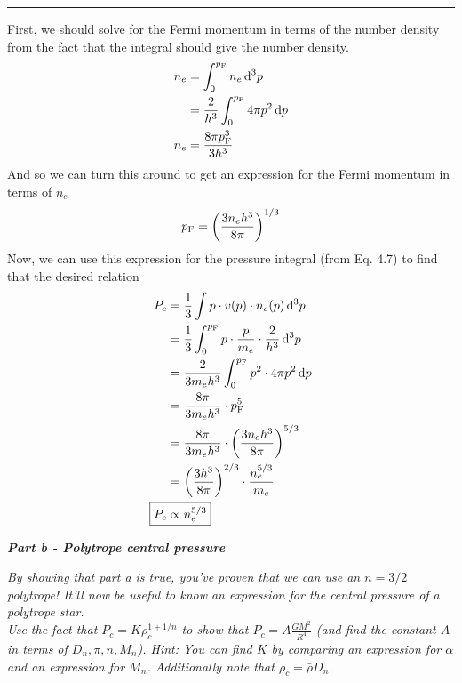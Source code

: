 \documentclass[12pt, letterpaper, twoside]{article}
\newcommand{\question}[1]{{\noindent \it #1}}
\newcommand{\answer}[1]{
    \par\noindent\rule{\textwidth}{0.4pt}#1\vspace{0.5cm}
}
\begin{document}
\answer{
    First, we should solve for the Fermi momentum in terms of the number density from the fact that the integral should give the number density.
    \begin{align}
        n_e &= \int_0^{p_{\rm F}} n_e \dd[3]{p} \\
            &= \frac{2}{h^3} \int_0^{p_{\rm F}} 4 \pi p^2 \dd{p} \\
        n_e &= \frac{8 \pi p_{\rm F}^3}{3 h^3}
    \end{align}
    And so we can turn this around to get an expression for the Fermi momentum in terms of $n_e$
    \begin{equation}
        p_{\rm F} = \qty(\frac{3 n_e h^3}{8 \pi})^{1/3}
    \end{equation}
    Now, we can use this expression for the pressure integral (from Eq. 4.7) to find that the desired relation
    \begin{align}
        P_e &= \frac{1}{3} \int p \cdot v(p) \cdot n_e(p) \dd[3]{p} \\
            &= \frac{1}{3} \int_0^{p_{\rm F}} p \cdot \frac{p}{m_e} \cdot \frac{2}{h^3} \dd[3]{p} \\
            &= \frac{2}{3 m_e h^3} \int_0^{p_{\rm F}} p^2 \cdot 4 \pi p^2 \dd{p} \\
            &= \frac{8 \pi}{3 m_e h^3} \cdot p_{\rm F}^5 \\
            &= \frac{8 \pi}{3 m_e h^3} \cdot \qty(\frac{3 n_e h^3}{8 \pi})^{5/3} \\
            &= \qty(\frac{3 h^3}{8 \pi})^{2/3} \cdot \frac{n_e^{5/3}}{m_e} \\
        \Aboxed{ P_e &\propto n_e^{5/3} }
    \end{align}
}

\question{\textbf{Part b - Polytrope central pressure}}

\question{By showing that part a is true, you've proven that we can use an $n = 3/2$ polytrope! It'll now be useful to know an expression for the central pressure of a polytrope star.\\

\noindent Use the fact that $P_c = K \rho_c^{1 + 1/n}$ to show that $P_c = A \frac{G M^2}{R^4}$ (and find the constant $A$ in terms of $D_n, \pi, n, M_n$). Hint: You can find $K$ by comparing an expression for $\alpha$ and an expression for $M_n$. Additionally note that $\rho_c = \bar{\rho} D_n$.}
\end{document}
